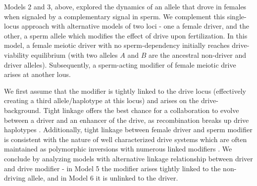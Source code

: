 \documentclass[12pt,letterpaper]{article}
\newcommand{\yb}[1]{{ \color{blue} #1}}
\begin{document}

Models 2 and 3, above, explored the dynamics of an allele that drove in females when signaled by a complementary signal in sperm.   
We complement this single-locus approach %
	with alternative models of two loci - one a female driver, 
	and the other, a sperm allele which modifies the effect of drive upon fertilization. 
In this model, a female meiotic driver with no sperm-dependency 
	initially reaches drive-viability equilibrium (with two alleles
	$A$ and $B$ are the ancestral non-driver and driver alleles). 
Subsequently, a sperm-acting modifier of female meiotic drive arises at another lous. 

We first assume that the modifier is tightly
        linked to the drive locus (effectively creating a third
        allele/haplotype at this locus) and arises on the drive-background. 
Tight linkage offers the best
        chance for a collaboration to evolve between a driver and
       an enhancer of the drive, as recombination breaks up drive haplotypes \citep{Thomson1974,Charlesworth1978,Haig1991}. 
Additionally, tight linkage between female driver and sperm modifier is consistent with the nature of well characterized drive systems which are often maintained as polymorphic inversions with numerous linked modifiers \cite{Burt2006}. 
We conclude by analyzing models with alternative linkage relationship between driver and drive modifier - 
	in Model 5 the modifier arises tightly linked to the non-driving allele, 
	and in Model 6 it is unlinked to the driver. 

\end{document}
